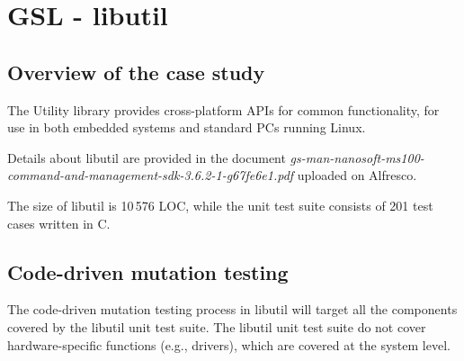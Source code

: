 %
%
%


\section{GSL - libutil}
\label{sec:caseStudies:GSL:libutil}

\subsection{Overview of the case study}

The Utility library provides cross-platform APIs for common functionality, for use in both embedded systems and standard PCs running Linux. 

Details about libutil are provided in the document \emph{gs-man-nanosoft-ms100-command-and-management-sdk-3.6.2-1-g67fe6e1.pdf} uploaded on Alfresco.

The size of libutil is 10\,576 LOC, while the unit test suite consists of 201 test cases written in C.

\subsection{Code-driven mutation testing}

The code-driven mutation testing process in libutil will target all the components covered by the libutil unit test suite. 
The libutil unit test suite do not cover hardware-specific functions (e.g., drivers), which are covered at the system level.



